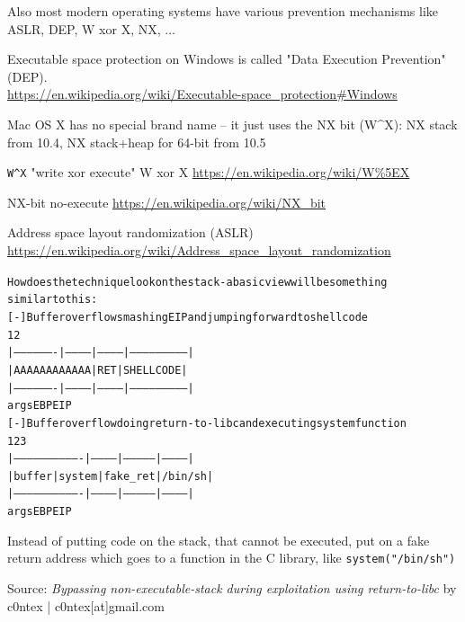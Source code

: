 \documentclass[Screen16to9,17pt]{foils}
\begin{document}
Also most modern operating systems have various prevention mechanisms like ASLR, DEP, W xor X, NX, ...

\begin{list2}
\item Executable space protection on Windows is called "Data Execution Prevention" (DEP).\\
\url{https://en.wikipedia.org/wiki/Executable-space_protection#Windows}
\item Mac OS X has no special brand name -- it just uses the NX bit (W\^{}X): NX stack from 10.4, NX stack+heap for 64-bit from 10.5
\item \verb+W^X+ "write xor execute" W xor X \url{https://en.wikipedia.org/wiki/W%5EX}
\item NX-bit no-execute \url{https://en.wikipedia.org/wiki/NX_bit}
\item Address space layout randomization (ASLR) \url{https://en.wikipedia.org/wiki/Address_space_layout_randomization}
\end{list2}


\begin{alltt}\footnotesize
  How does the technique look on the stack - a basic view will be something
  similar to this:
  [-] Buffer overflow smashing EIP and jumping forward to shellcode
                                                   1                    2
  |-------------------|-----------|------------|---------------------------|
  |             AAAAAAAAAAAA      |    RET     |        SHELLCODE          |
  |-------------------|-----------|------------|---------------------------|
                     args              EBP        EIP
  [-] Buffer overflow doing return-to-libc and executing system function
                                                    1             2         3
  |-------------------------------|------------|--------------|------------|
  |            buffer             |   system   |   fake_ret   |   /bin/sh  |
  |-------------------------------|------------|--------------|------------|
                     args               EBP        EIP
\end{alltt}
Instead of putting code on the stack, that cannot be executed, put on a fake return address which goes to a function in the C library, like \verb+system("/bin/sh")+

Source:
\emph{Bypassing non-executable-stack during exploitation using return-to-libc}
 by c0ntex | c0ntex[at]gmail.com
\end{document}
